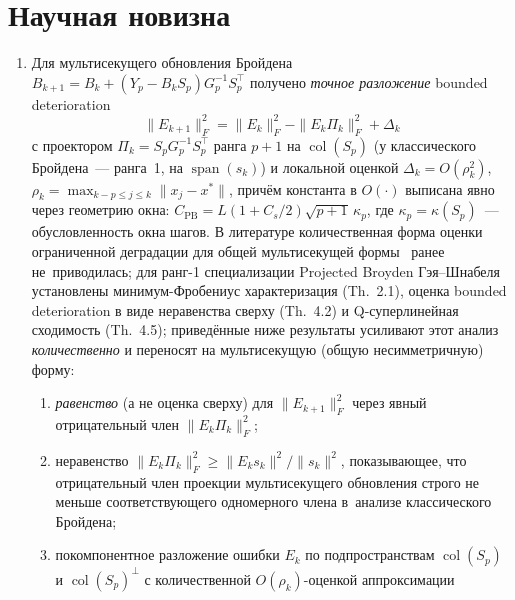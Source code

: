 \section*{Научная новизна}

\begin{enumerate}[leftmargin=*]
  \item Для мультисекущего обновления Бройдена~\cite{schnabel1983}
        $B_{k+1} = B_k + (Y_p - B_k S_p)G_p^{-1}S_p^\top$ получено
        \emph{точное разложение} bounded deterioration
        \[
          \|E_{k+1}\|_F^2 = \|E_k\|_F^2 - \|E_k\Pi_k\|_F^2 + \Delta_k
        \]
        с проектором $\Pi_k = S_p G_p^{-1} S_p^\top$ ранга $p{+}1$ на
        $\operatorname{col}(S_p)$ (у классического Бройдена~--- ранга~1,
        на $\operatorname{span}(s_k)$) и локальной оценкой
        $\Delta_k = O(\rho_k^2)$,
        $\rho_k = \max_{k-p\le j\le k}\|x_j-x^*\|$, причём константа в
        $O(\cdot)$ выписана явно через геометрию окна:
        $C_{\mathrm{PB}} = L(1+C_s/2)\sqrt{p+1}\,\kappa_p$, где
        $\kappa_p = \kappa(S_p)$~--- обусловленность окна шагов.
        В литературе количественная форма оценки ограниченной деградации
        для общей мультисекущей формы~\cite{schnabel1983} ранее
        не~приводилась; для ранг-1 специализации Projected Broyden
        Гэя--Шнабеля~\cite{gay_schnabel1978} установлены
        минимум-Фробениус характеризация (Th.~2.1), оценка bounded
        deterioration в виде неравенства сверху (Th.~4.2) и Q-суперлинейная
        сходимость (Th.~4.5); приведённые ниже результаты усиливают этот
        анализ \emph{количественно} и переносят на мультисекущую (общую
        несимметричную) форму:
        \begin{enumerate}[label=(\alph*),leftmargin=*]
          \item \emph{равенство} (а не оценка сверху)
                для $\|E_{k+1}\|_F^2$ через явный отрицательный
                член $\|E_k\Pi_k\|_F^2$;
          \item неравенство
                $\|E_k\Pi_k\|_F^2 \ge \|E_k s_k\|^2/\|s_k\|^2$,
                показывающее, что отрицательный член проекции
                мультисекущего обновления строго не меньше
                соответствующего одномерного члена в~анализе
                классического Бройдена;
          \item покомпонентное разложение ошибки $E_k$ по подпространствам
                $\operatorname{col}(S_p)$ и $\operatorname{col}(S_p)^\perp$
                с количественной $O(\rho_k)$-оценкой аппроксимации

\end{enumerate}
\end{enumerate}
